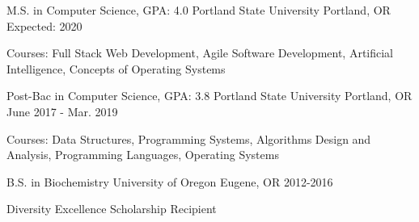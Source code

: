 
\begin{cventries}
  \cventry
    {M.S. in Computer Science, GPA: 4.0} %
    {Portland State University} %
    {Portland, OR} %
    {Expected: 2020} %
    {
      \begin{cvitems} %
         \item {Courses: Full Stack Web Development, Agile Software Development, Artificial Intelligence, Concepts of Operating Systems}
      \end{cvitems}
    }

  \cventry
  {Post-Bac in Computer Science, GPA: 3.8}
  {Portland State University}
  {Portland, OR}
  {June 2017 - Mar. 2019}
  {
    \begin{cvitems} %
    \item {Courses: Data Structures, Programming Systems, Algorithms Design and Analysis, Programming Languages, Operating Systems}
    \end{cvitems}
  }


  \cventry
  {B.S. in Biochemistry}
  {University of Oregon}
  {Eugene, OR}
  {2012-2016}
  {
      \begin{cvitems} %
         \item {Diversity Excellence Scholarship Recipient}
      \end{cvitems}
  }

\end{cventries}
